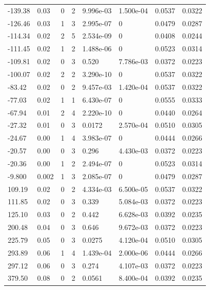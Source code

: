 \documentclass[preview]{standalone}
\begin{document}
{{\begin{tabular}{L{1.2cm}C{1.2cm} C{0.3cm}C{0.5cm} C{1.4cm}C{1.4cm} C{1.4cm}C{1.4cm}}
  -139.38  &  0.03  & 0     &  2 &  9.996e-03  & 1.500e-04  & 0.0537 &  0.0322   \\ 
  -126.46  &  0.03  & 1     &  3 &  2.995e-07  & 0  & 0.0479 &  0.0287   \\ 
  -114.34  &  0.02  & 2     &  5 &  2.534e-09  & 0  & 0.0408 &  0.0244   \\ 
  -111.45  &  0.02  & 1     &  2 &  1.488e-06  & 0  & 0.0523 &  0.0314   \\ 
  -109.81  &  0.02  & 0     &  3 &  0.520  & 7.786e-03  & 0.0372 &  0.0223   \\ 
  -100.07  &  0.02  & 2     &  2 &  3.290e-10  & 0  & 0.0537 &  0.0322   \\ 
  -83.42  &  0.02  & 0     &  2 &  9.457e-03  & 1.420e-04  & 0.0537 &  0.0322   \\ 
  -77.03  &  0.02  & 1     &  1 &  6.430e-07  & 0  & 0.0555 &  0.0333   \\ 
  -67.94  &  0.01  & 2     &  4 &  2.220e-10  & 0  & 0.0440 &  0.0264   \\ 
  -27.32  &  0.01  & 0     &  3 &  0.0172  & 2.570e-04  & 0.0510 &  0.0305   \\ 
  -24.67  &  0.00  & 1     &  4 &  3.983e-07  & 0  & 0.0444 &  0.0266   \\ 
  -20.57  &  0.00  & 0     &  3 &  0.296  & 4.430e-03  & 0.0372 &  0.0223   \\ 
  -20.36  &  0.00  & 1     &  2 &  2.494e-07  & 0  & 0.0523 &  0.0314   \\ 
  -9.800  &  0.002  & 1     &  3 &  2.085e-07  & 0  & 0.0479 &  0.0287   \\ 
  109.19  &  0.02  & 0     &  2 &  4.334e-03  & 6.500e-05  & 0.0537 &  0.0322   \\ 
  111.85  &  0.02  & 0     &  3 &  0.339  & 5.084e-03  & 0.0372 &  0.0223   \\ 
  125.10  &  0.03  & 0     &  2 &  0.442  & 6.628e-03  & 0.0392 &  0.0235   \\ 
  200.48  &  0.04  & 0     &  3 &  0.646  & 9.672e-03  & 0.0372 &  0.0223   \\ 
  225.79  &  0.05  & 0     &  3 &  0.0275  & 4.120e-04  & 0.0510 &  0.0305   \\ 
  293.89  &  0.06  & 1     &  4 &  1.439e-04  & 2.000e-06  & 0.0444 &  0.0266   \\ 
  297.12  &  0.06  & 0     &  3 &  0.274  & 4.107e-03  & 0.0372 &  0.0223   \\ 
  379.50  &  0.08  & 0     &  2 &  0.0561  & 8.400e-04  & 0.0392 &  0.0235   \\ 

\end{tabular}}}
\end{document}
